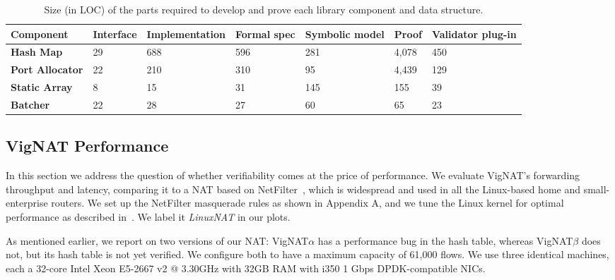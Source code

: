 \documentclass[letterpaper,twocolumn,10pt]{article}
\newcommand{\vignat}{{\sc VigNAT}\xspace}
\newcommand{\vignata}{{\sc VigNAT$\alpha$}\xspace}
\newcommand{\vignatb}{{\sc VigNAT$\beta$}\xspace}
\begin{document}
\begin{table}[h!]
\centering
\caption{Size (in LOC) of the parts required to develop and prove each  library component and data structure.}
\label{tab:loc}
\begin{tabular}{lllllll}
\hline
  Component             & Interface & Implementation & Formal spec & Symbolic model & Proof & Validator plug-in \\ \hline
{\bf Hash Map}        & 29         & 688            & 596                  & 281            & 4,078         & 450              \\
{\bf Port Allocator} & 22         & 210            & 310                  & 95             & 4,439         & 129              \\
{\bf Static Array}   & 8          & 15             & 31                   & 145            & 155          & 39               \\
{\bf Batcher}        & 22         & 28             & 27                   & 60             & 65           & 23               \\ \hline
\end{tabular}
\end{table}

\subsection{\vignat Performance}
\label{sec:performance}

In this section we address the question of whether verifiability comes at the
price of performance. We evaluate \vignat's forwarding throughput and latency,
comparing it to a NAT based on NetFilter~\cite{boye2013netfilter}, which is
widespread and used in all the Linux-based home and small-enterprise routers. We
set up the NetFilter masquerade rules as shown in Appendix A, and we tune the
Linux kernel for optimal performance as described in~\cite{nf-testing}. We label
it {\em LinuxNAT} in our plots.

As mentioned earlier, we report on two versions of our NAT: \vignata has a
performance bug in the hash table, whereas \vignatb does not, but its hash table
is not yet verified. We configure both to have a maximum capacity of 61,000
flows. We use three identical machines, each a 32-core Intel Xeon E5-2667 v2 @
3.30GHz with 32GB RAM with i350 1 Gbps DPDK-compatible NICs.

\end{document}
